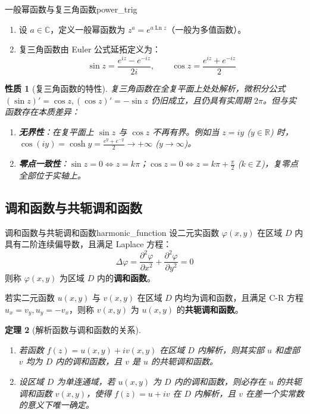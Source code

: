 \documentclass[11pt,a4paper,fontset=fandol]{ctexart}
\newtheorem{theorem}{定理}[section]
\newtheorem{property}[theorem]{性质}
\theoremstyle{remark}
\begin{document}
\begin{definition}{一般幂函数与复三角函数}{power_trig}
\begin{enumerate}
    \item 设 $a \in \mathbb{C}$，定义一般幂函数为 $z^a = e^{a \operatorname{Ln} z}$（一般为多值函数）。
    \item 复三角函数由 Euler 公式延拓定义为：
    \begin{equation}
        \sin z = \frac{e^{iz} - e^{-iz}}{2i}, \qquad \cos z = \frac{e^{iz} + e^{-iz}}{2}
    \end{equation}
\end{enumerate}
\end{definition}

\begin{property}[复三角函数的特性]
复三角函数在全复平面上处处解析，微积分公式 $(\sin z)' = \cos z, (\cos z)' = -\sin z$ 仍旧成立，且仍具有实周期 $2\pi$。但与实函数存在本质差异：
\begin{enumerate}
    \item \textbf{无界性}：在复平面上 $\sin z$ 与 $\cos z$ 不再有界。例如当 $z = iy$ ($y \in \mathbb{R}$) 时，$\cos(iy) = \cosh y = \frac{e^y + e^{-y}}{2} \to +\infty$ ($y \to \infty$)。
    \item \textbf{零点一致性}：$\sin z = 0 \iff z = k\pi$；$\cos z = 0 \iff z = k\pi + \frac{\pi}{2}$ ($k \in \mathbb{Z}$)，复零点全部位于实轴上。
\end{enumerate}
\end{property}

\subsection{调和函数与共轭调和函数}

\begin{definition}{调和函数与共轭调和函数}{harmonic_function}
设二元实函数 $\varphi(x, y)$ 在区域 $D$ 内具有二阶连续偏导数，且满足 Laplace 方程：
\begin{equation}
    \Delta \varphi = \frac{\partial^2 \varphi}{\partial x^2} + \frac{\partial^2 \varphi}{\partial y^2} = 0
\end{equation}
则称 $\varphi(x, y)$ 为区域 $D$ 内的\textbf{调和函数}。

若实二元函数 $u(x, y)$ 与 $v(x, y)$ 在区域 $D$ 内均为调和函数，且满足 C-R 方程 $u_x = v_y, u_y = -v_x$，则称 $v(x, y)$ 为 $u(x, y)$ 的\textbf{共轭调和函数}。
\end{definition}

\begin{theorem}[解析函数与调和函数的关系]
\begin{enumerate}
    \item 若函数 $f(z) = u(x, y) + i v(x, y)$ 在区域 $D$ 内解析，则其实部 $u$ 和虚部 $v$ 均为 $D$ 内的调和函数，且 $v$ 是 $u$ 的共轭调和函数。
    \item 设区域 $D$ 为单连通域，若 $u(x, y)$ 为 $D$ 内的调和函数，则必存在 $u$ 的共轭调和函数 $v(x, y)$，使得 $f(z) = u + iv$ 在 $D$ 内解析，且 $v$ 在差一个实常数的意义下唯一确定。
\end{enumerate}
\end{theorem}
\end{document}
